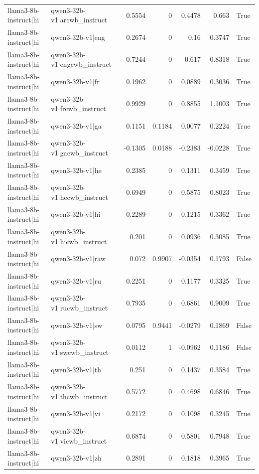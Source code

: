 \begin{table}
\begin{tabular}{l l r r r r l}
llama3-8b-instruct|hi & qwen3-32b-v1|arcwb_instruct & 0.5554 & 0 & 0.4478 & 0.663 & True \\
llama3-8b-instruct|hi & qwen3-32b-v1|eng & 0.2674 & 0 & 0.16 & 0.3747 & True \\
llama3-8b-instruct|hi & qwen3-32b-v1|engcwb_instruct & 0.7244 & 0 & 0.617 & 0.8318 & True \\
llama3-8b-instruct|hi & qwen3-32b-v1|fr & 0.1962 & 0 & 0.0889 & 0.3036 & True \\
llama3-8b-instruct|hi & qwen3-32b-v1|frcwb_instruct & 0.9929 & 0 & 0.8855 & 1.1003 & True \\
llama3-8b-instruct|hi & qwen3-32b-v1|ga & 0.1151 & 0.1184 & 0.0077 & 0.2224 & True \\
llama3-8b-instruct|hi & qwen3-32b-v1|gacwb_instruct & -0.1305 & 0.0188 & -0.2383 & -0.0228 & True \\
llama3-8b-instruct|hi & qwen3-32b-v1|he & 0.2385 & 0 & 0.1311 & 0.3459 & True \\
llama3-8b-instruct|hi & qwen3-32b-v1|hecwb_instruct & 0.6949 & 0 & 0.5875 & 0.8023 & True \\
llama3-8b-instruct|hi & qwen3-32b-v1|hi & 0.2289 & 0 & 0.1215 & 0.3362 & True \\
llama3-8b-instruct|hi & qwen3-32b-v1|hicwb_instruct & 0.201 & 0 & 0.0936 & 0.3085 & True \\
llama3-8b-instruct|hi & qwen3-32b-v1|raw & 0.072 & 0.9907 & -0.0354 & 0.1793 & False \\
llama3-8b-instruct|hi & qwen3-32b-v1|ru & 0.2251 & 0 & 0.1177 & 0.3325 & True \\
llama3-8b-instruct|hi & qwen3-32b-v1|rucwb_instruct & 0.7935 & 0 & 0.6861 & 0.9009 & True \\
llama3-8b-instruct|hi & qwen3-32b-v1|sw & 0.0795 & 0.9441 & -0.0279 & 0.1869 & False \\
llama3-8b-instruct|hi & qwen3-32b-v1|swcwb_instruct & 0.0112 & 1 & -0.0962 & 0.1186 & False \\
llama3-8b-instruct|hi & qwen3-32b-v1|th & 0.251 & 0 & 0.1437 & 0.3584 & True \\
llama3-8b-instruct|hi & qwen3-32b-v1|thcwb_instruct & 0.5772 & 0 & 0.4698 & 0.6846 & True \\
llama3-8b-instruct|hi & qwen3-32b-v1|vi & 0.2172 & 0 & 0.1098 & 0.3245 & True \\
llama3-8b-instruct|hi & qwen3-32b-v1|vicwb_instruct & 0.6874 & 0 & 0.5801 & 0.7948 & True \\
llama3-8b-instruct|hi & qwen3-32b-v1|zh & 0.2891 & 0 & 0.1818 & 0.3965 & True \\

\end{tabular}
\end{table}

